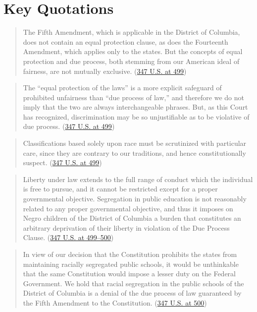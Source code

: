 \documentclass[12pt]{article}
\begin{document}
\section{Key Quotations}

\begin{quote}
The Fifth Amendment, which is applicable in the District of Columbia, does not contain an equal protection clause, as does the Fourteenth Amendment, which applies only to the states. But the concepts of equal protection and due process, both stemming from our American ideal of fairness, are not mutually exclusive. (\href{https://supreme.justia.com/cases/federal/us/347/497/}{347 U.S. at 499})
\end{quote}

\begin{quote}
The ``equal protection of the laws'' is a more explicit safeguard of prohibited unfairness than ``due process of law,'' and therefore we do not imply that the two are always interchangeable phrases. But, as this Court has recognized, discrimination may be so unjustifiable as to be violative of due process. (\href{https://supreme.justia.com/cases/federal/us/347/497/}{347 U.S. at 499})
\end{quote}

\begin{quote}
Classifications based solely upon race must be scrutinized with particular care, since they are contrary to our traditions, and hence constitutionally suspect. (\href{https://supreme.justia.com/cases/federal/us/347/497/}{347 U.S. at 499})
\end{quote}

\begin{quote}
Liberty under law extends to the full range of conduct which the individual is free to pursue, and it cannot be restricted except for a proper governmental objective. Segregation in public education is not reasonably related to any proper governmental objective, and thus it imposes on Negro children of the District of Columbia a burden that constitutes an arbitrary deprivation of their liberty in violation of the Due Process Clause. (\href{https://supreme.justia.com/cases/federal/us/347/497/}{347 U.S. at 499--500})
\end{quote}

\begin{quote}
In view of our decision that the Constitution prohibits the states from maintaining racially segregated public schools, it would be unthinkable that the same Constitution would impose a lesser duty on the Federal Government. We hold that racial segregation in the public schools of the District of Columbia is a denial of the due process of law guaranteed by the Fifth Amendment to the Constitution. (\href{https://www.courtlistener.com/opinion/105222/bolling-v-sharpe/}{347 U.S. at 500})
\end{quote}
\end{document}
